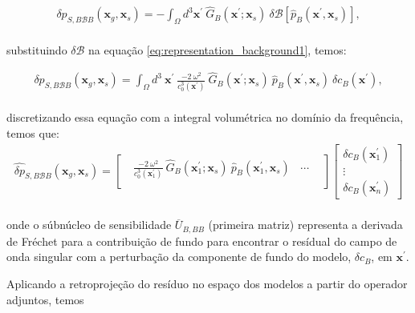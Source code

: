 \begin{eqnarray}
\label{eq:representation_background1}
    \hat{\delta p}_{S, B\mathcal{B}B}(\mathbf{x}_{g}, \mathbf{x}_{s}) = - \int_{\Omega} d^{3}\mathbf{x}^{\prime}~ \hat{G}_{B}(\mathbf{x}^{\prime}; \mathbf{x}_{s}) ~ \delta \mathcal{B}\left[ \hat{p}_{B}(\mathbf{x}^{\prime},\mathbf{x}_{s}) \right],
\end{eqnarray}
\\

substituindo $\delta \mathcal{B}$ na equação \ref{eq:representation_background1}, temos:

\begin{eqnarray}
  \hat{\delta p}_{S, B\mathcal{B}B}(\mathbf{x}_{g}, \mathbf{x}_{s}) =  \int_{\Omega} d^{3}~\mathbf{x}^{\prime}~ \frac{-2~\omega^{2}}{c_{0}^{3}(\mathbf{x}^{\prime})}~ \hat{G}_{B}(\mathbf{x}^{\prime}; \mathbf{x}_{s}) ~\hat{p}_{B}(\mathbf{x}^{\prime},\mathbf{x}_{s})~ \delta c_{B}(\mathbf{x}^{\prime}),
\end{eqnarray}
\\
discretizando essa equação com a integral volumétrica no domínio da frequência, temos que:
\begin{eqnarray}
  \hat{\delta p}_{S, B\mathcal{B}B}(\mathbf{x}_{g}, \mathbf{x}_{s})
   =
 \begin{bmatrix}
  ~~~\frac{-2~\omega^{2}}{c_{0}^{3}(\mathbf{x}_{1}^{\prime})}~ \hat{G}_{B}(\mathbf{x}_{1}^{\prime}; \mathbf{x}_{s}) ~\hat{p}_{B}(\mathbf{x}_{1}^{\prime},\mathbf{x}_{s})~~~~ \cdots ~~~~\\
 \end{bmatrix}
\begin{bmatrix}
\delta c_{B}(\mathbf{x}_{1}^{\prime}) \\
\vdots \\
\delta c_{B}(\mathbf{x}_{n}^{\prime})
\end{bmatrix}
\end{eqnarray}
\\
onde o súbnúcleo de sensibilidade $\overline{U}_{B,BB}$ (primeira matriz) representa a derivada de Fréchet para a contribuição de fundo para encontrar o resídual do campo de onda singular com a perturbação da componente de fundo do modelo, $\delta c_{B}$, em $\mathbf{x}^{\prime}$.

Aplicando a retroprojeção do resíduo no espaço dos modelos a partir do operador adjuntos, temos

